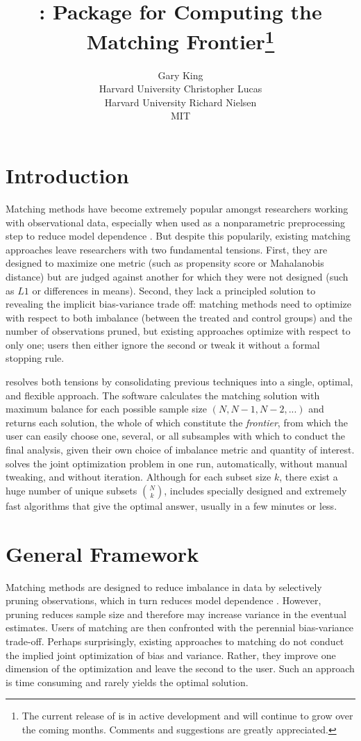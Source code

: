 \documentclass[nojss]{jss}
\author{Gary King\\Harvard University \And 
        Christopher Lucas\\Harvard University \And 
        Richard Nielsen\\MIT}
\title{\pkg{MatchingFrontier}: \proglang{R} Package for Computing the Matching Frontier\thanks{The current release of \pkg{MatchingFrontier} is in active development and will continue to grow over the coming months. Comments and suggestions are greatly appreciated.}}
\begin{document}

\section[Introduction]{Introduction}

Matching methods have become extremely popular amongst researchers
working with observational data, especially when used as a
nonparametric preprocessing step to reduce model dependence
\citep{ho2007,ho2009}. But despite this popularily, existing matching
approaches leave researchers with two fundamental tensions. First,
they are designed to maximize one metric (such as propensity score or
Mahalanobis distance) but are judged against another for which they
were not designed (such as $L1$ or differences in means). Second, they
lack a principled solution to revealing the implicit bias-variance
trade off: matching methods need to optimize with respect to both
imbalance (between the treated and control groups) and the number of
observations pruned, but existing approaches optimize with respect to
only one; users then either ignore the second or tweak it without a
formal stopping rule.

 resolves both tensions by consolidating
previous techniques into a single, optimal, and flexible approach. The
software calculates the matching solution with maximum balance for
each possible sample size $(N, N-1, N-2,...)$ and returns each
solution, the whole of which constitute the \emph{frontier}, from
which the user can easily choose one, several, or all subsamples with
which to conduct the final analysis, given their own choice of
imbalance metric and quantity of interest. 
solves the joint optimization problem in one run, automatically,
without manual tweaking, and without iteration.  Although for each
subset size $k$, there exist a huge number of unique subsets $N
\choose k$,  includes specially designed and
extremely fast algorithms that give the optimal answer, usually in a
few minutes or less.

\section[What MatchingFrontier Does]{General Framework}\label{sec:framework}

Matching methods are designed to reduce imbalance in data by
selectively pruning observations, which in turn reduces model
dependence \citep{king2006,imai2008,iacus2011a,ho2007}. However,
pruning reduces sample size and therefore may increase variance in the
eventual estimates. Users of matching are then confronted with the
perennial bias-variance trade-off. Perhaps surprisingly, existing
approaches to matching do not conduct the implied joint optimization
of bias and variance. Rather, they improve one dimension of the
optimization and leave the second to the user. Such an approach is
time consuming and rarely yields the optimal solution.
\end{document}

